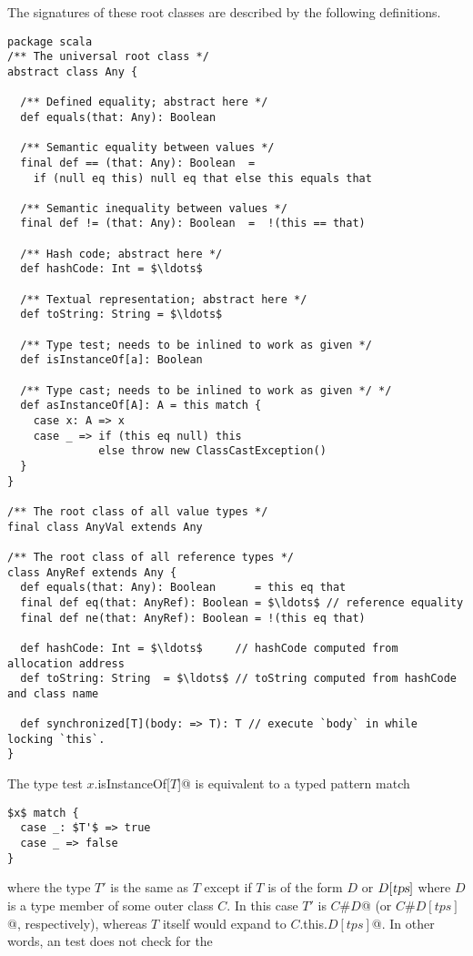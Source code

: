 The signatures of these root classes are described by the following
definitions.

\begin{lstlisting}
package scala 
/** The universal root class */
abstract class Any {

  /** Defined equality; abstract here */
  def equals(that: Any): Boolean 

  /** Semantic equality between values */
  final def == (that: Any): Boolean  =  
    if (null eq this) null eq that else this equals that

  /** Semantic inequality between values */
  final def != (that: Any): Boolean  =  !(this == that)

  /** Hash code; abstract here */
  def hashCode: Int = $\ldots$

  /** Textual representation; abstract here */
  def toString: String = $\ldots$

  /** Type test; needs to be inlined to work as given */
  def isInstanceOf[a]: Boolean

  /** Type cast; needs to be inlined to work as given */ */
  def asInstanceOf[A]: A = this match {
    case x: A => x
    case _ => if (this eq null) this
              else throw new ClassCastException()
  }
}

/** The root class of all value types */
final class AnyVal extends Any 

/** The root class of all reference types */
class AnyRef extends Any {
  def equals(that: Any): Boolean      = this eq that 
  final def eq(that: AnyRef): Boolean = $\ldots$ // reference equality
  final def ne(that: AnyRef): Boolean = !(this eq that)

  def hashCode: Int = $\ldots$     // hashCode computed from allocation address
  def toString: String  = $\ldots$ // toString computed from hashCode and class name

  def synchronized[T](body: => T): T // execute `body` in while locking `this`.
}
\end{lstlisting}

The type test \lstinline@$x$.isInstanceOf[$T$]@ is equivalent to a typed
pattern match
\begin{lstlisting} 
$x$ match {
  case _: $T'$ => true
  case _ => false
}
\end{lstlisting} 
where the type $T'$ is the same as $T$ except if $T$ is
of the form $D$ or $D[\mbox{\sl tps}]$ where $D$ is a type member of some outer
class $C$. In this case $T'$ is \lstinline@$C$#$D$@ (or
\lstinline@$C$#$D[tps]$@, respectively), whereas $T$ itself would
expand to \lstinline@$C$.this.$D[tps]$@. In other words, an
\lstinline@isInstanceOf@ test does not check for the   


